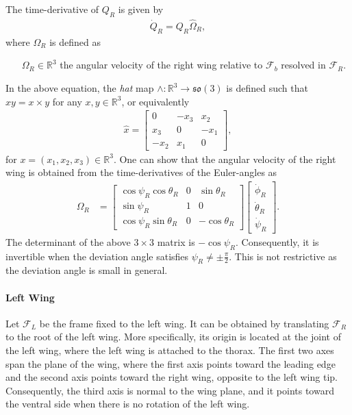 \documentclass[10pt]{article}
\newcommand{\so}{\ensuremath{\mathfrak{so}(3)}}
\renewcommand{\Re}{\ensuremath{\mathbb{R}}}
\begin{document}
The time-derivative of $Q_R$ is given by
\begin{align}
    \dot Q_R = Q_R \hat \Omega_R,
\end{align}
where $\Omega_R$ is defined as
\begin{itemize}[leftmargin=2.5cm]
    \item[$\Omega_R\in\Re^3$]  the angular velocity of the right wing relative to $\mathcal{F}_b$ resolved in $\mathcal{F}_R$.
\end{itemize}
In the above equation, the \textit{hat} map $\wedge:\Re^3\rightarrow \so$ is defined such that $\hat x y = x\times y$ for any $x,y\in\Re^3$, or equivalently
\begin{align}
    \hat x = \begin{bmatrix}
        0 & -x_3 & x_2 \\
        x_3 & 0 & -x_1 \\
        -x_2 & x_1 & 0 
    \end{bmatrix},
\end{align}
for $x=(x_1,x_2,x_3)\in\Re^3$. 
One can show that the angular velocity of the right wing is obtained from the time-derivatives of the Euler-angles as 
\begin{align}
    \Omega_R & =
    \begin{bmatrix} 
        \cos\psi_R\cos\theta_R & 0 & \sin\theta_R \\
        \sin\psi_R & 1 & 0 \\
        \cos\psi_R\sin\theta_R& 0& -\cos\theta_R
    \end{bmatrix}
    \begin{bmatrix}
        \dot\phi_R \\ \dot\theta_R \\ \dot\psi_R
    \end{bmatrix}.
\end{align}
The determinant of the above $3\times 3$ matrix is $-\cos\psi_R$. 
Consequently, it is invertible when the deviation angle satisfies $\psi_R\neq \pm\frac{\pi}{2}$. 
This is not restrictive as the deviation angle is small in general. 


\paragraph{Left Wing}

Let $\mathcal{F}_L$ be the frame fixed to the left wing.
It can be obtained by translating $\mathcal{F}_R$ to the root of the left wing.
More specifically, its origin is located at the joint of the left wing, where the left wing is attached to the thorax. 
The first two axes span the plane of the wing, where the first axis points toward the leading edge and the second axis points toward the right wing, opposite to the left wing tip.
Consequently, the third axis is normal to the wing plane, and it points toward the ventral side when there is no rotation of the left wing.
\end{document}
